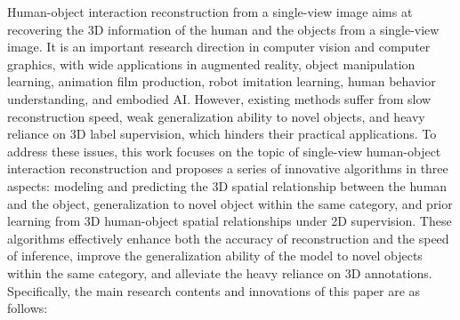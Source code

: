 \begin{abstract*}[flattitle]
Human-object interaction reconstruction from a single-view image aims at recovering the 3D information of the human and the objects from a single-view image. It is an important research direction in computer vision and computer graphics, with wide applications in augmented reality, object manipulation learning, animation film production, robot imitation learning, human behavior understanding, and embodied AI. However, existing methods suffer from slow reconstruction speed, weak generalization ability to novel objects, and heavy reliance on 3D label supervision, which hinders their practical applications. To address these issues, this work focuses on the topic of single-view human-object interaction reconstruction and proposes a series of innovative algorithms in three aspects: modeling and predicting the 3D spatial relationship between the human and the object, generalization to novel object within the same category, and prior learning from 3D human-object spatial relationships under 2D supervision. These algorithms effectively enhance both the accuracy of reconstruction and the speed of inference, improve the generalization ability of the model to novel objects within the same category, and alleviate the heavy reliance on 3D annotations.  Specifically, the main research contents and innovations of this paper are as follows:


\end{abstract*}
